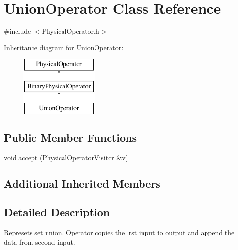 \hypertarget{class_union_operator}{\section{Union\+Operator Class Reference}
\label{class_union_operator}
}


{\ttfamily \#include $<$Physical\+Operator.\+h$>$}

Inheritance diagram for Union\+Operator\+:\begin{figure}[H]
\begin{center}
\leavevmode
\includegraphics[height=3.000000cm]{class_union_operator}
\end{center}
\end{figure}
\subsection*{Public Member Functions}
\begin{DoxyCompactItemize}
\item 
void \hyperlink{class_union_operator_a534cf044caa5074d4a493edff1209e16}{accept} (\hyperlink{class_physical_operator_visitor}{Physical\+Operator\+Visitor} \&v)
\end{DoxyCompactItemize}
\subsection*{Additional Inherited Members}


\subsection{Detailed Description}
Represets set union. Operator copies the rst input to output and append the data from second input. 

